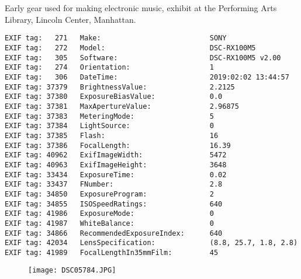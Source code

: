 \section{\protect{}}
\noindent Early gear used for making electronic music, exhibit at the Performing Arts Library, Lincoln Center, Manhattan.
\noindent
\begin{lstlisting}
EXIF tag:   271   Make:                          SONY
EXIF tag:   272   Model:                         DSC-RX100M5
EXIF tag:   305   Software:                      DSC-RX100M5 v2.00
EXIF tag:   274   Orientation:                   1
EXIF tag:   306   DateTime:                      2019:02:02 13:44:57
EXIF tag: 37379   BrightnessValue:               2.2125
EXIF tag: 37380   ExposureBiasValue:             0.0
EXIF tag: 37381   MaxApertureValue:              2.96875
EXIF tag: 37383   MeteringMode:                  5
EXIF tag: 37384   LightSource:                   0
EXIF tag: 37385   Flash:                         16
EXIF tag: 37386   FocalLength:                   16.39
EXIF tag: 40962   ExifImageWidth:                5472
EXIF tag: 40963   ExifImageHeight:               3648
EXIF tag: 33434   ExposureTime:                  0.02
EXIF tag: 33437   FNumber:                       2.8
EXIF tag: 34850   ExposureProgram:               2
EXIF tag: 34855   ISOSpeedRatings:               640
EXIF tag: 41986   ExposureMode:                  0
EXIF tag: 41987   WhiteBalance:                  0
EXIF tag: 34866   RecommendedExposureIndex:      640
EXIF tag: 42034   LensSpecification:             (8.8, 25.7, 1.8, 2.8)
EXIF tag: 41989   FocalLengthIn35mmFilm:         45

\end{lstlisting}
\clearpage
\begin{figure}
\raggedleft
\texttt{[image: DSC05784.JPG]}
\end{figure}


\clearpage

